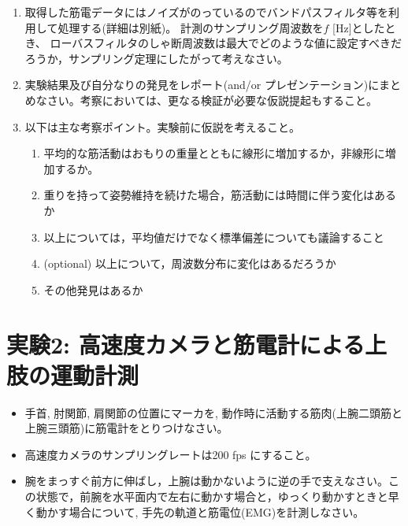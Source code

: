 \documentclass{jsarticle}
\begin{document}
\begin{enumerate}
  \item 取得した筋電データにはノイズがのっているのでバンドパスフィルタ等を利用して処理する(詳細は別紙)。
  計測のサンプリング周波数を$f$ [Hz]としたとき、
  ローバスフィルタのしゃ断周波数は最大でどのような値に設定すべきだろうか，サンプリング定理にしたがって考えなさい。
  \item 実験結果及び自分なりの発見をレポート(and/or プレゼンテーション)にまとめなさい。考察においては、更なる検証が必要な仮説提起もすること。
  \item 以下は主な考察ポイント。実験前に仮説を考えること。
  \begin{enumerate}
    \item 平均的な筋活動はおもりの重量とともに線形に増加するか，非線形に増加するか。
    \item 重りを持って姿勢維持を続けた場合，筋活動には時間に伴う変化はあるか
    \item 以上については，平均値だけでなく標準偏差についても議論すること
    \item (optional) 以上について，周波数分布に変化はあるだろうか
    \item その他発見はあるか
  \end{enumerate}
  
\end{enumerate}


\section{実験2: 高速度カメラと筋電計による上肢の運動計測}


\begin{itemize}
\item 手首, 肘関節, 肩関節の位置にマーカを, 動作時に活動する筋肉(上腕二頭筋と上腕三頭筋)に筋電計をとりつけなさい。
\item 高速度カメラのサンプリングレートは200 fps にすること。
\item 
腕をまっすぐ前方に伸ばし，上腕は動かないように逆の手で支えなさい。この状態で，前腕を水平面内で左右に動かす場合と，ゆっくり動かすときと早く動かす場合について, 手先の軌道と筋電位(EMG)を計測しなさい。
\end{itemize}
\end{document}

